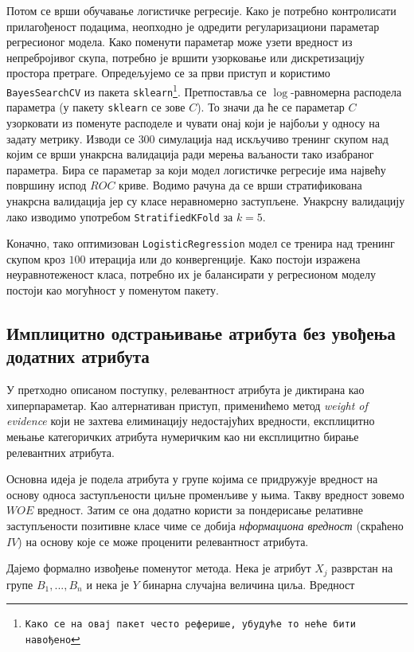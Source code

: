 \documentclass[12pt, a4paper]{article}
\begin{document}
		Потом се врши обучавање логистичке регресије. Како је потребно контролисати прилагођеност подацима, неопходно је одредити регуларизациони параметар регресионог модела. Како поменути параметар може узети вредност из непребројивог скупа, потребно је вршити узорковање или дискретизацију простора претраге. Опредељујемо се за први приступ и користимо \texttt{BayesSearchCV} из пакета \texttt{sklearn\footnote{Како се на овај пакет често реферише, убудуће то неће бити навођено}}. Претпоставља се $\log$-равномерна расподела параметра (у пакету \texttt{sklearn} се зове $C$). То значи да ће се параметар $C$ узорковати из поменуте расподеле и чувати онај који је најбољи у односу на задату метрику. Изводи се $300$ симулација над искључиво тренинг скупом над којим се врши унакрсна валидација ради мерења ваљаности тако изабраног параметра. Бира се параметар за који модел логистичке регресије има највећу површину испод $ROC$ криве. Водимо рачуна да се врши стратификована унакрсна валидација јер су класе неравномерно заступљене. Унакрсну валидацију лако изводимо употребом \texttt{StratifiedKFold} за $k=5$.
	
		Коначно, тако оптимизован \texttt{LogisticRegression} модел се тренира над тренинг скупом кроз $100$ итерација или до конвергенције. Како постоји изражена неуравнотеженост класа, потребно их је балансирати у регресионом моделу постоји као могућност у поменутом пакету.
	
	\subsection{Имплицитно одстрањивање атрибута без увођења додатних атрибута}
		У претходно описаном поступку, релевантност атрибута је диктирана као хиперпараметар. Као алтернативан приступ, применићемо метод \textit{weight of evidence} који не захтева елиминацију недостајућих вредности, експлицитно мењање категоричких атрибута нумеричким као ни експлицитно бирање релевантних атрибута.
		
		Основна идеја је подела атрибута у групе којима се придружује вредност на основу односа заступљености циљне променљиве у њима. Такву вредност зовемо $WOE$ вредност. Затим се она додатно користи за пондерисање релативне заступљености позитивне класе чиме се добија \textit{нформациона вредност} (скраћено $IV$) на основу које се може проценити релевантност атрибута.
		
		Дајемо формално извођење поменутог метода. Нека је атрибут $X_j$ разврстан на групе $B_1, ..., B_n$ и нека је $Y$ бинарна случајна величина циља. Вредност
		
\end{document}

